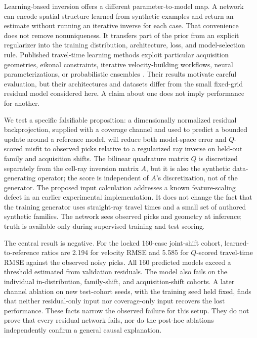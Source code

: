 \documentclass[11pt]{article}
\begin{document}
Learning-based inversion offers a different parameter-to-model map. A network can encode spatial structure learned from synthetic examples and return an estimate without running an iterative inverse for each case. That convenience does not remove nonuniqueness. It transfers part of the prior from an explicit regularizer into the training distribution, architecture, loss, and model-selection rule. Published travel-time learning methods exploit particular acquisition geometries, eikonal constraints, iterative velocity-building workflows, neural parameterizations, or probabilistic ensembles \cite{FanYing2023,Muller2023,LiEKI2025,Zeng2026,WangSpace2026}. Their results motivate careful evaluation, but their architectures and datasets differ from the small fixed-grid residual model considered here. A claim about one does not imply performance for another.

We test a specific falsifiable proposition: a dimensionally normalized residual backprojection, supplied with a coverage channel and used to predict a bounded update around a reference model, will reduce both model-space error and $Q$-scored misfit to observed picks relative to a regularized ray inverse on held-out family and acquisition shifts. The bilinear quadrature matrix $Q$ is discretized separately from the cell-ray inversion matrix $A$, but it is also the synthetic data-generating operator; the score is independent of $A$'s discretization, not of the generator. The proposed input calculation addresses a known feature-scaling defect in an earlier experimental implementation. It does not change the fact that the training generator uses straight-ray travel times and a small set of authored synthetic families. The network sees observed picks and geometry at inference; truth is available only during supervised training and test scoring.

The central result is negative. For the locked 160-case joint-shift cohort, learned-to-reference ratios are 2.194 for velocity RMSE and 5.585 for $Q$-scored travel-time RMSE against the observed noisy picks. All 160 predicted models exceed a threshold estimated from validation residuals. The model also fails on the individual in-distribution, family-shift, and acquisition-shift cohorts. A later channel ablation on new test-cohort seeds, with the training seed held fixed, finds that neither residual-only input nor coverage-only input recovers the lost performance. These facts narrow the observed failure for this setup. They do not prove that every residual network fails, nor do the post-hoc ablations independently confirm a general causal explanation.
\end{document}
